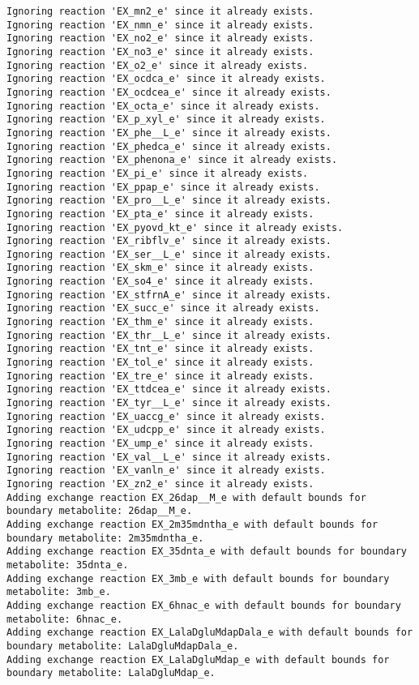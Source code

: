 \documentclass[
  letterpaper,
  DIV=11,
  numbers=noendperiod]{scrartcl}
\begin{document}
\begin{verbatim}
Ignoring reaction 'EX_mn2_e' since it already exists.
Ignoring reaction 'EX_nmn_e' since it already exists.
Ignoring reaction 'EX_no2_e' since it already exists.
Ignoring reaction 'EX_no3_e' since it already exists.
Ignoring reaction 'EX_o2_e' since it already exists.
Ignoring reaction 'EX_ocdca_e' since it already exists.
Ignoring reaction 'EX_ocdcea_e' since it already exists.
Ignoring reaction 'EX_octa_e' since it already exists.
Ignoring reaction 'EX_p_xyl_e' since it already exists.
Ignoring reaction 'EX_phe__L_e' since it already exists.
Ignoring reaction 'EX_phedca_e' since it already exists.
Ignoring reaction 'EX_phenona_e' since it already exists.
Ignoring reaction 'EX_pi_e' since it already exists.
Ignoring reaction 'EX_ppap_e' since it already exists.
Ignoring reaction 'EX_pro__L_e' since it already exists.
Ignoring reaction 'EX_pta_e' since it already exists.
Ignoring reaction 'EX_pyovd_kt_e' since it already exists.
Ignoring reaction 'EX_ribflv_e' since it already exists.
Ignoring reaction 'EX_ser__L_e' since it already exists.
Ignoring reaction 'EX_skm_e' since it already exists.
Ignoring reaction 'EX_so4_e' since it already exists.
Ignoring reaction 'EX_stfrnA_e' since it already exists.
Ignoring reaction 'EX_succ_e' since it already exists.
Ignoring reaction 'EX_thm_e' since it already exists.
Ignoring reaction 'EX_thr__L_e' since it already exists.
Ignoring reaction 'EX_tnt_e' since it already exists.
Ignoring reaction 'EX_tol_e' since it already exists.
Ignoring reaction 'EX_tre_e' since it already exists.
Ignoring reaction 'EX_ttdcea_e' since it already exists.
Ignoring reaction 'EX_tyr__L_e' since it already exists.
Ignoring reaction 'EX_uaccg_e' since it already exists.
Ignoring reaction 'EX_udcpp_e' since it already exists.
Ignoring reaction 'EX_ump_e' since it already exists.
Ignoring reaction 'EX_val__L_e' since it already exists.
Ignoring reaction 'EX_vanln_e' since it already exists.
Ignoring reaction 'EX_zn2_e' since it already exists.
Adding exchange reaction EX_26dap__M_e with default bounds for boundary metabolite: 26dap__M_e.
Adding exchange reaction EX_2m35mdntha_e with default bounds for boundary metabolite: 2m35mdntha_e.
Adding exchange reaction EX_35dnta_e with default bounds for boundary metabolite: 35dnta_e.
Adding exchange reaction EX_3mb_e with default bounds for boundary metabolite: 3mb_e.
Adding exchange reaction EX_6hnac_e with default bounds for boundary metabolite: 6hnac_e.
Adding exchange reaction EX_LalaDgluMdapDala_e with default bounds for boundary metabolite: LalaDgluMdapDala_e.
Adding exchange reaction EX_LalaDgluMdap_e with default bounds for boundary metabolite: LalaDgluMdap_e.

\end{verbatim}
\end{document}

